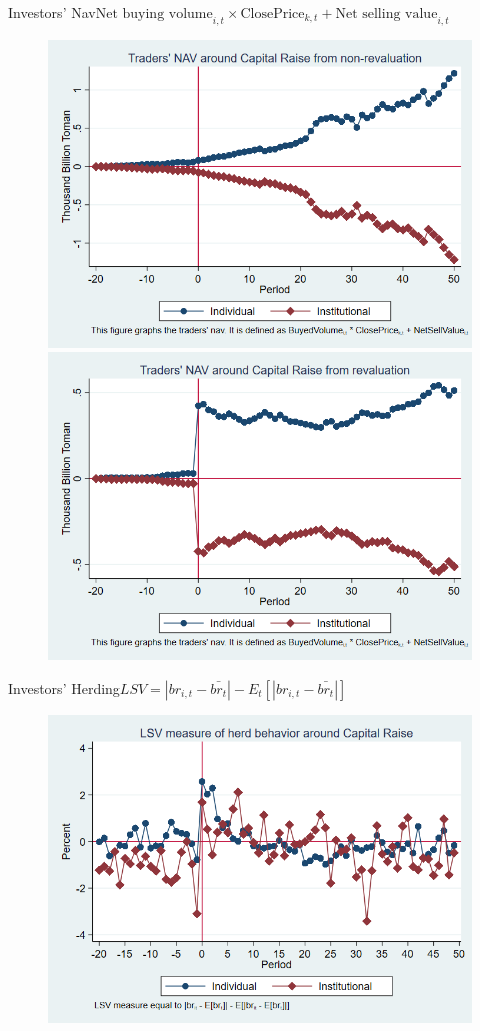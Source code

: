 \documentclass{beamer}
\begin{document}
	\begin{frame}{Investors' Nav}{$ \text{Net buying volume}_{i,t} \times \text{ClosePrice}_{k,t} + \text{Net selling value}_{i,t} $}
	\begin{figure}
		\centering
		\includegraphics[width=0.45\linewidth]{Output/IndInsNav_NoRevaluation.png}
		\includegraphics[width=0.45\linewidth]{Output/IndInsNav_Revaluation.png}
		\label{fig:IndInsNav_Revaluation}
	\end{figure}
\end{frame}
	
	
	
	\begin{frame}{Investors' Herding}{$LSV =  |br_{i,t} - \bar{br_{t}}| - E_t[|br_{i,t} - \bar{br_{t}}|] $}
		\begin{figure}
			\centering
			\includegraphics[width=0.65\linewidth]{Output/IndInsHerd.png}
			\label{fig:IndInsHerd}
		\end{figure}
	\end{frame}
	
\end{document}
